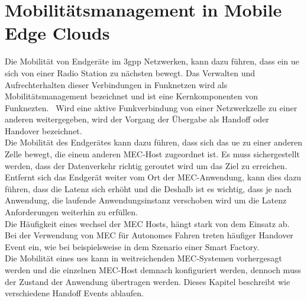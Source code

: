 \documentclass[runningheads]{llncs}
\numberwithin{figure}{section}
\begin{document}
\newpage

\section{Mobilitätsmanagement in Mobile Edge Clouds}
\label{sec:Mobilitätsmanagement}
Die Mobilität von Endgeräte im \acrshort{3gpp} Netzwerken, kann dazu führen, dass ein \acrshort{ue} sich von einer 
Radio Station zu nächsten bewegt. Das Verwalten und Aufrechterhalten dieser Verbindungen in Funknetzen wird
als Mobilitätsmanagement bezeichnet und ist eine Kernkomponenten von Funknezten. 
Wird eine aktive Funkverbindung von einer Netzwerkzelle zu einer anderen weitergegeben, wird der Vorgang
der Übergabe als Handoff oder Handover bezeichnet.\\
Die Mobilität des Endgerätes kann dazu führen, 
dass sich das \acrshort{ue} zu einer anderen Zelle bewegt, 
die einem anderen MEC-Host zugeordnet ist. Es muss sichergestellt werden, dass der Datenverkehr
richtig geroutet wird um das Ziel zu erreichen.
Entfernt sich das Endgerät weiter vom Ort der MEC-Anwendung, 
kann dies dazu führen, dass die Latenz sich erhöht und die Deshalb ist es wichtig, dass je nach Anwendung,
die laufende Anwendungsinstanz verschoben wird um die Latenz Anforderungen weiterhin zu erfüllen. \\
Die Häufigkeit eines wechsel der MEC Hosts, hängt stark von dem 
Einsatz ab. Bei der Verwendung von MEC für Autonomes Fahren treten häufiger Handover Event ein, wie bei
beispielsweise in dem Szenario einer Smart Factory.\\
Die Mobilität eines \acrshort{ue}s kann in weitreichenden MEC-Systemen vorhergesagt werden und die einzelnen MEC-Host demnach konfiguriert werden,
dennoch muss der Zustand der Anwendung übertragen werden.
Dieses Kapitel beschreibt wie verschiedene Handoff Events ablaufen.
\end{document}
